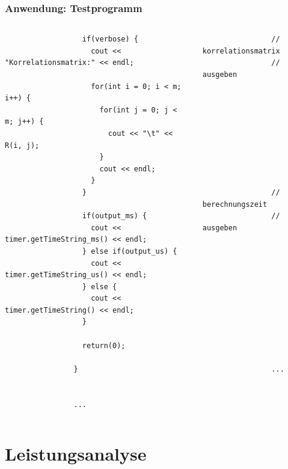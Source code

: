 \documentclass{beamer}
\begin{document}
\begin{frame}[fragile]
  \frametitle{Anwendung: Testprogramm}
	
	\begin{columns}
			\begin{lstlisting}
				  if(verbose) {
				    cout << "Korrelationsmatrix:" << endl;
					
				    for(int i = 0; i < m; i++) {
				      for(int j = 0; j < m; j++) {
				        cout << "\t" << R(i, j);
				      }
				      cout << endl;
				    }
				  }
				
				  if(output_ms) {
				    cout << timer.getTimeString_ms() << endl;
				  } else if(output_us) {
				    cout << timer.getTimeString_us() << endl;    
				  } else {
				    cout << timer.getTimeString() << endl;
				  }
				
				  return(0);
				
				}
				
				
				...
			\end{lstlisting}
			\begin{lstlisting}
				// korrelationsmatrix
				// ausgeben
				
				
				
				
				
				
				
				
				
				// berechnungszeit
				// ausgeben
				
				
				
				
				
				
				
				
				
				
				
				...
			\end{lstlisting}
	\end{columns}
\end{frame}

\section{Leistungsanalyse}
\end{document}
